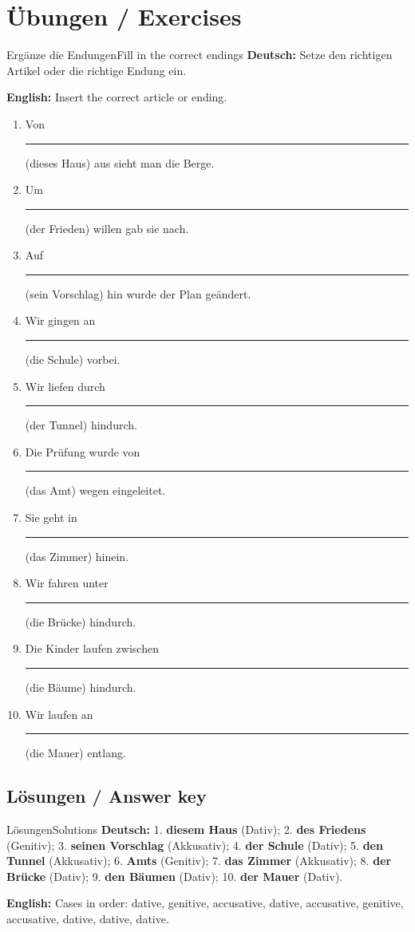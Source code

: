 \documentclass[a4paper,11pt]{article}
\newcommand{\GermanText}[1]{\textbf{Deutsch: }#1\par}
\newcommand{\EnglishText}[1]{{\small\color{SoftGray}\textbf{English: }#1\par}}
\begin{document}
\section{Übungen / Exercises}
\begin{grammarentry}{Ergänze die Endungen}{Fill in the correct endings}
\GermanText{Setze den richtigen Artikel oder die richtige Endung ein.}
\EnglishText{Insert the correct article or ending.}
\begin{enumerate}
\item Von \rule{1cm}{0.4pt} (dieses Haus) aus sieht man die Berge.
\item Um \rule{1cm}{0.4pt} (der Frieden) willen gab sie nach.
\item Auf \rule{1cm}{0.4pt} (sein Vorschlag) hin wurde der Plan geändert.
\item Wir gingen an \rule{1cm}{0.4pt} (die Schule) vorbei.
\item Wir liefen durch \rule{1cm}{0.4pt} (der Tunnel) hindurch.
\item Die Prüfung wurde von \rule{1cm}{0.4pt} (das Amt) wegen eingeleitet.
\item Sie geht in \rule{1cm}{0.4pt} (das Zimmer) hinein.
\item Wir fahren unter \rule{1cm}{0.4pt} (die Brücke) hindurch.
\item Die Kinder laufen zwischen \rule{1cm}{0.4pt} (die Bäume) hindurch.
\item Wir laufen an \rule{1cm}{0.4pt} (die Mauer) entlang.
\end{enumerate}
\end{grammarentry}
\subsection{Lösungen / Answer key}
\begin{grammarentry}{Lösungen}{Solutions}
\GermanText{1. \textbf{diesem Haus} (Dativ); 2. \textbf{des Friedens} (Genitiv); 3. \textbf{seinen Vorschlag} (Akkusativ); 4. \textbf{der Schule} (Dativ); 5. \textbf{den Tunnel} (Akkusativ); 6. \textbf{Amts} (Genitiv); 7. \textbf{das Zimmer} (Akkusativ); 8. \textbf{der Brücke} (Dativ); 9. \textbf{den Bäumen} (Dativ); 10. \textbf{der Mauer} (Dativ).}
\EnglishText{Cases in order: dative, genitive, accusative, dative, accusative, genitive, accusative, dative, dative, dative.}
\end{grammarentry}
\end{document}
